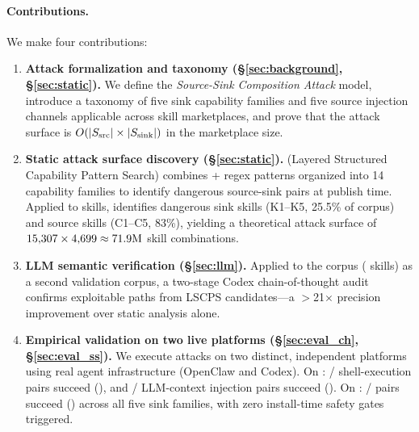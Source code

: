\paragraph{Contributions.}
We make four contributions:

\begin{enumerate}[leftmargin=*, label=\textbf{C\arabic*.},topsep=2pt]

\item \textbf{Attack formalization and taxonomy (\S\ref{sec:background}, \S\ref{sec:static}).}
We define the \emph{Source-Sink Composition Attack} model,
introduce a taxonomy of five sink capability families and five source injection
channels applicable across skill marketplaces,
and prove that the attack surface is $O(|S_{\rm src}| \times |S_{\rm sink}|)$
in the marketplace size.

\item \textbf{Static attack surface discovery (\S\ref{sec:static}).}
\lscps (Layered Structured Capability Pattern Search) combines
\NpatternsLSCPS{}+ regex patterns organized into 14 capability families
to identify dangerous source-sink pairs at publish time.
Applied to \NskillsCH{} \clawhub skills, \lscps identifies
\NsinkCH{} dangerous sink skills (K1--K5, 25.5\% of corpus)
and \NsrcCH{} source skills (C1--C5, 83\%),
yielding a theoretical attack surface of $15{,}307 \times 4{,}699 \approx 71.9\mathrm{M}$ skill combinations.

\item \textbf{LLM semantic verification (\S\ref{sec:llm}).}
Applied to the \skillssh{} corpus (\NskillsSH{} skills) as a second validation corpus,
a two-stage Codex chain-of-thought audit confirms \NcodexConfirm{} exploitable paths
from \NselfExfil{} LSCPS candidates---a
$>$21$\times$ precision improvement over static analysis alone.

\item \textbf{Empirical validation on two live platforms (\S\ref{sec:eval_ch}, \S\ref{sec:eval_ss}).}
We execute \sysname attacks on two distinct, independent platforms
using real agent infrastructure (OpenClaw and Codex).
On \clawhub: \NpairsCHshell/\NpairsCHshell{} shell-execution pairs succeed
(\PairsCHshellRate), and \NpairsCHConeok/\NpairsCHCone{} LLM-context injection
pairs succeed (\PairsCHConeRate).
On \skillssh: \NpairsSSsuccess/\NpairsSSlaunched{} pairs succeed
(\PairsSSrate) across all five sink families,
with zero install-time safety gates triggered.

\end{enumerate}


